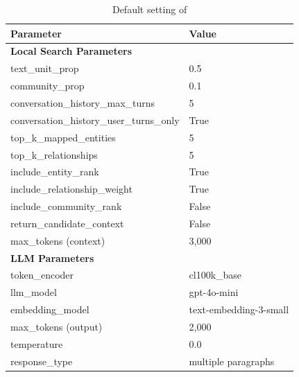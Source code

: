 \begin{table}[!th]
\centering
\caption{Default setting of \rag}
\label{tbl:default_para_graphrag}
\small
\def\arraystretch{1.2}
\setlength{\tabcolsep}{3pt}
\begin{tabular}{ll}
\toprule
\textbf{Parameter} & \textbf{Value} \\ \hline
\multicolumn{2}{l}{\textbf{Local Search Parameters}} \\ \hline
text\_unit\_prop & 0.5 \\
community\_prop & 0.1 \\
conversation\_history\_max\_turns & 5 \\
conversation\_history\_user\_turns\_only & True \\
top\_k\_mapped\_entities & 5 \\
top\_k\_relationships & 5 \\
include\_entity\_rank & True \\
include\_relationship\_weight & True \\
include\_community\_rank & False \\
return\_candidate\_context & False \\
max\_tokens (context) & 3,000 \\ \hline
\multicolumn{2}{l}{\textbf{LLM Parameters}} \\ \hline
token\_encoder & cl100k\_base \\
llm\_model & gpt-4o-mini \\
embedding\_model & text-embedding-3-small \\ 
max\_tokens (output) & 2,000 \\
temperature & 0.0 \\
response\_type & multiple paragraphs \\
\bottomrule
\end{tabular}
\end{table}


